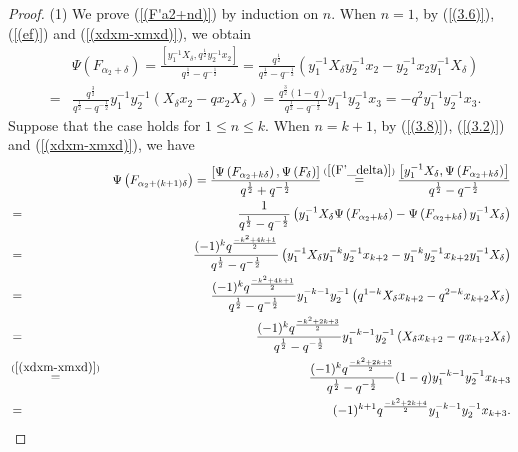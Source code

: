 \documentclass[reqno,11pt]{amsart}
\numberwithin{equation}{section}
\begin{document}
\begin{proof}
(1) We prove (\ref{(F'a2+nd)}) by induction on $n$. When $n=1$, by (\ref{(3.6)}), (\ref{(ef)}) and (\ref{(xdxm-xmxd)}), we obtain\begingroup
{}
\begin{eqnarray*}
	&&\Psi\left(F_{\alpha_2+\delta}\right)  =\frac{\left[y_1^{-1} X_\delta, q^{\frac{1}{2}} y_2^{-1} x_2\right]}{q^{\frac{1}{2}}-q^{-\frac{1}{2}}}=\frac{q^{\frac{1}{2}}}{q^{\frac{1}{2}}-q^{-\frac{1}{2}}}\left(y_1^{-1} X_\delta y_2^{-1} x_2-y_2^{-1} x_2 y_1^{-1} X_\delta\right) \\
	& =&\frac{q^{\frac{3}{2}}}{q^{\frac{1}{2}}-q^{-\frac{1}{2}}} y_1^{-1} y_2^{-1}\left(X_\delta x_2-q x_2 X_\delta\right)=\frac{q^{\frac{3}{2}}(1-q)}{q^{\frac{1}{2}}-q^{-\frac{1}{2}}} y_1^{-1} y_2^{-1} x_3=-q^2 y_1^{-1} y_2^{-1} x_3 .
\end{eqnarray*}
Suppose that the case holds for $1 \le n \le k$. When $n=k+1$, by (\ref{(3.8)}), (\ref{(3.2)}) and (\ref{(xdxm-xmxd)}), we have
\begin{eqnarray*}
	&&\Psi\left(F_{\alpha_2+(k+1) \delta}\right)  =\frac{{\left[ {\Psi \left( {{F_{{\alpha _2} + k\delta }}} \right),\Psi \left( {{F_\delta }} \right)} \right]}}{{{q^{\frac{1}{2}}} + {q^{ - \frac{1}{2}}}}}\mathop  = \limits^{(\ref{(F'_delta)})}\frac{\left[y_1^{-1} X_\delta, \Psi\left(F_{\alpha_2+k \delta}\right)\right]}{q^{\frac{1}{2}}-q^{-\frac{1}{2}}} \\
	& =&\frac{1}{q^{\frac{1}{2}}-q^{-\frac{1}{2}}}\left(y_1^{-1} X_\delta \Psi\left(F_{\alpha_2+k \delta}\right)-\Psi\left(F_{\alpha_2+k \delta}\right) y_1^{-1} X_\delta\right) \\
	& =&\frac{(-1)^k q^{\frac{-k^2+4 k+1}{2}}}{q^{\frac{1}{2}}-q^{-\frac{1}{2}}}\left(y_1^{-1} X_\delta y_1^{-k} y_2^{-1} x_{k+2}-y_1^{-k} y_2^{-1} x_{k+2} y_1^{-1} X_\delta\right) \\
	& =&\frac{(-1)^k q^{\frac{-k^2+4 k+1}{2}}}{q^{\frac{1}{2}}-q^{-\frac{1}{2}}} y_1^{-k-1} y_2^{-1}\left(q^{1-k} X_\delta x_{k+2}-q^{2-k} x_{k+2} X_\delta\right) \\
	& 	=&\frac{(-1)^k q^{\frac{-k^2+2 k+3}{2}}}{q^{\frac{1}{2}}-q^{-\frac{1}{2}}} y_1^{-k-1} y_2^{-1}\left(X_\delta x_{k+2}-q x_{k+2} X_\delta\right) \\
	& \mathop  = \limits^{(\ref{(xdxm-xmxd)})}& \frac{(-1)^k q^{\frac{-k^2+2 k+3}{2}}}{q^{\frac{1}{2}}-q^{-\frac{1}{2}}}(1-q) y_1^{-k-1} y_2^{-1} x_{k+3} \\
	& =&(-1)^{k+1} q^{\frac{-k^2+2 k+4}{2}} y_1^{-k-1} y_2^{-1} x_{k+3} .
\end{eqnarray*}



\end{proof}
\end{document}
